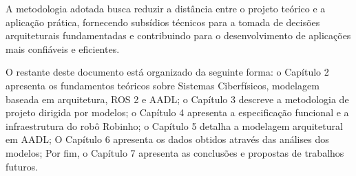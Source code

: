 A metodologia adotada busca reduzir a distância entre o projeto teórico e a aplicação prática, fornecendo subsídios técnicos para a tomada de decisões arquiteturais fundamentadas e contribuindo para o desenvolvimento de aplicações mais confiáveis e eficientes. 

O restante deste documento está organizado da seguinte forma: 
o Capítulo 2 apresenta os fundamentos teóricos sobre Sistemas Ciberfísicos, modelagem baseada em arquitetura, ROS 2 e AADL; 
o Capítulo 3 descreve a metodologia de projeto dirigida por modelos; 
o Capítulo 4 apresenta a especificação funcional e a infraestrutura do robô Robinho; 
o Capítulo 5 detalha a modelagem arquitetural em AADL; 
O Capítulo 6 apresenta os dados obtidos através das análises dos modelos;
Por fim, o Capítulo 7 apresenta as conclusões e propostas de trabalhos futuros. 
